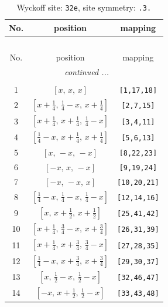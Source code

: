 \documentclass[fleqn,8pt]{jsarticle}
\begin{document}
\renewcommand{\arraystretch}{1.2}
\begin{longtable}{ccc}
\caption{Wyckoff site: {\tt 32e}, site symmetry: {\tt .3.}}
 \\
 \hline \hline
No. & position & mapping \\ \hline \endfirsthead

\multicolumn{2}{l}{\tablename\ \thetable{}} \\
 \hline \hline
No. & position & mapping \\ \hline \endhead

 \hline \hline
\multicolumn{2}{r}{\footnotesize\it continued ...} \\ \endfoot

 \hline \hline
\multicolumn{2}{r}{} \\ \endlastfoot

1 & $\left[ x,\, x,\, x \right]$ & {\tt [1,17,18]} \\ \hline
2 & $\left[ x + \frac{1}{4},\, \frac{1}{4} - x,\, x + \frac{1}{4} \right]$ & {\tt [2,7,15]} \\ \hline
3 & $\left[ x + \frac{1}{4},\, x + \frac{1}{4},\, \frac{1}{4} - x \right]$ & {\tt [3,4,11]} \\ \hline
4 & $\left[ \frac{1}{4} - x,\, x + \frac{1}{4},\, x + \frac{1}{4} \right]$ & {\tt [5,6,13]} \\ \hline
5 & $\left[ x,\, - x,\, - x \right]$ & {\tt [8,22,23]} \\ \hline
6 & $\left[ - x,\, x,\, - x \right]$ & {\tt [9,19,24]} \\ \hline
7 & $\left[ - x,\, - x,\, x \right]$ & {\tt [10,20,21]} \\ \hline
8 & $\left[ \frac{1}{4} - x,\, \frac{1}{4} - x,\, \frac{1}{4} - x \right]$ & {\tt [12,14,16]} \\ \hline
9 & $\left[ x,\, x + \frac{1}{2},\, x + \frac{1}{2} \right]$ & {\tt [25,41,42]} \\ \hline
10 & $\left[ x + \frac{1}{4},\, \frac{3}{4} - x,\, x + \frac{3}{4} \right]$ & {\tt [26,31,39]} \\ \hline
11 & $\left[ x + \frac{1}{4},\, x + \frac{3}{4},\, \frac{3}{4} - x \right]$ & {\tt [27,28,35]} \\ \hline
12 & $\left[ \frac{1}{4} - x,\, x + \frac{3}{4},\, x + \frac{3}{4} \right]$ & {\tt [29,30,37]} \\ \hline
13 & $\left[ x,\, \frac{1}{2} - x,\, \frac{1}{2} - x \right]$ & {\tt [32,46,47]} \\ \hline
14 & $\left[ - x,\, x + \frac{1}{2},\, \frac{1}{2} - x \right]$ & {\tt [33,43,48]} \\ \hline

\end{longtable}
\end{document}
